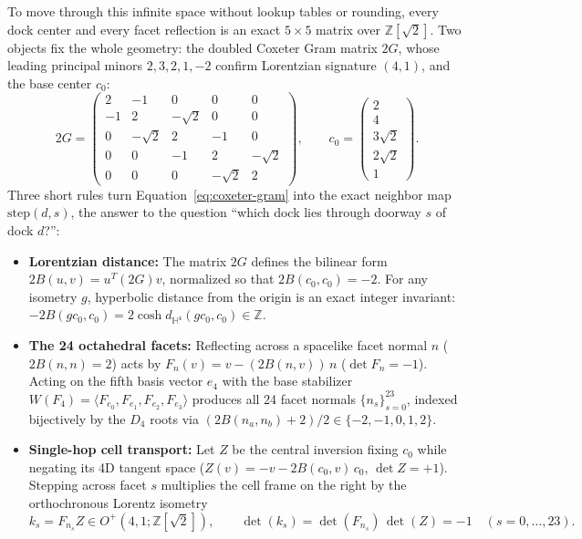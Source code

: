 To move through this infinite space without lookup tables or rounding, every dock center and every facet reflection is
an exact $5 \times 5$ matrix over $\mathbb{Z}[\sqrt{2}]$. Two objects fix the whole geometry: the doubled Coxeter Gram
matrix $2G$, whose leading principal minors $2, 3, 2, 1, -2$ confirm Lorentzian signature $(4,1)$, and the base center
$c_0$:
\begin{equation}
2G = \begin{pmatrix}
2 & -1 & 0 & 0 & 0 \\
-1 & 2 & -\sqrt{2} & 0 & 0 \\
0 & -\sqrt{2} & 2 & -1 & 0 \\
0 & 0 & -1 & 2 & -\sqrt{2} \\
0 & 0 & 0 & -\sqrt{2} & 2
\end{pmatrix},
\qquad
c_0 = \begin{pmatrix} 2 \\ 4 \\ 3\sqrt{2} \\ 2\sqrt{2} \\ 1 \end{pmatrix}.
\label{eq:coxeter-gram}
\end{equation}
Three short rules turn Equation~\eqref{eq:coxeter-gram} into the exact neighbor map $\mathrm{step}(d, s)$, the
answer to the question ``which dock lies through doorway $s$ of dock $d$?'':
\begin{itemize}[itemsep=2pt]
\item \textbf{Lorentzian distance:} The matrix $2G$ defines the bilinear form $2B(u, v) = u^T (2G) v$, normalized so
that $2B(c_0, c_0) = -2$. For any isometry $g$, hyperbolic distance from the origin is an exact integer invariant:
$-2B(g c_0, c_0) = 2\cosh d_{\mathbb{H}^4}(g c_0, c_0) \in \mathbb{Z}$.
\item \textbf{The 24 octahedral facets:} Reflecting across a spacelike facet normal $n$ ($2B(n, n) = 2$) acts by
$F_n(v) = v - (2B(n, v))\, n$ ($\det F_n = -1$). Acting on the fifth basis vector $e_4$ with the base stabilizer
$W(F_4) = \langle F_{e_0}, F_{e_1}, F_{e_2}, F_{e_3} \rangle$ produces all 24 facet normals $\{n_s\}_{s=0}^{23}$,
indexed bijectively by the $D_4$ roots via $(2B(n_a, n_b) + 2)/2 \in \{-2, -1, 0, 1, 2\}$.
\item \textbf{Single-hop cell transport:} Let $Z$ be the central inversion fixing $c_0$ while negating its 4D tangent
space ($Z(v) = -v - 2B(c_0, v)\, c_0$, $\det Z = +1$). Stepping across facet $s$ multiplies the cell frame on the right
by the orthochronous Lorentz isometry
\begin{equation}
k_s = F_{n_s} Z \in O^+(4,1; \mathbb{Z}[\sqrt{2}]),
\qquad
\det(k_s) = \det(F_{n_s})\,\det(Z) = -1 \quad (s = 0, \ldots, 23).
\label{eq:transport}
\end{equation}
\end{itemize}

